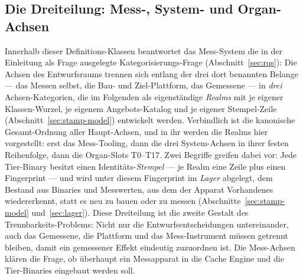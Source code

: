 \begin{nurlang}
\subsection{Die Dreiteilung: Mess-, System- und Organ-Achsen}\label{sec:axis-triad}
Innerhalb dieser Definitions-Klassen beantwortet das Mess-System die in der Einleitung als
Frage ausgelegte Kategorisierungs-Frage (Abschnitt~\ref{sec:rqs}): Die Achsen des Entwurfsraums trennen
sich entlang der drei dort benannten Belange --- das Messen selbst, die Bau- und Ziel-Plattform, das
Gemessene --- in \emph{drei} Achsen-Kategorien, die im Folgenden als eigenständige \emph{Realms}
mit je eigener Klassen-Wurzel, je eigenem Angebots-Katalog und je eigener Stempel-Zeile
(Abschnitt~\ref{sec:stamp-model}) entwickelt werden. Verbindlich ist die kanonische Gesamt-Ordnung
aller Haupt-Achsen, und in ihr werden die Realms hier vorgestellt: erst das Mess-Tooling, dann die
drei System-Achsen in ihrer festen Reihenfolge, dann die Organ-Slots T0--T17. Zwei Begriffe greifen
dabei vor: Jede Tier-Binary besitzt einen Identitäts-\emph{Stempel} --- je Realm eine Zeile plus einen
Fingerprint --- und wird unter diesem Fingerprint im \emph{Lager} abgelegt, dem Bestand aus Binaries
und Messwerten, aus dem der Apparat Vorhandenes wiedererkennt, statt es neu zu bauen oder zu messen
(Abschnitte~\ref{sec:stamp-model} und~\ref{sec:lager}). Diese Dreiteilung ist die zweite Gestalt des
Trennbarkeits-Problems: Nicht nur die Entwurfsentscheidungen untereinander, auch das Gemessene, die
Plattform und das Mess-Instrument müssen getrennt bleiben, damit ein gemessener Effekt eindeutig
zuzuordnen ist. Die Mess-Achsen klären die Frage, ob überhaupt ein Messapparat in die Cache Engine und die Tier-Binaries eingebaut werden soll. %
\end{nurlang}
